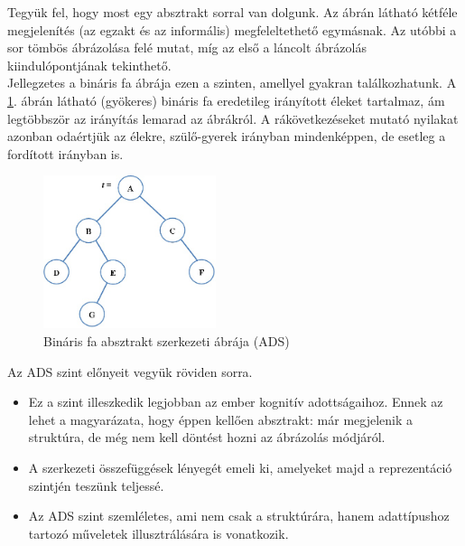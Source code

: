 \documentclass[12pt,margin=0px]{article}
\begin{document}
    {\footnotesize
    \noindent Tegyük fel, hogy most egy absztrakt sorral van dolgunk. Az ábrán látható kétféle megjelenítés (az egzakt és az informális) megfeleltethető egymásnak. Az utóbbi a sor tömbös ábrázolása felé mutat, míg az első a láncolt ábrázolás kiindulópontjának tekinthető.\\

    \noindent Jellegzetes a bináris fa ábrája ezen a szinten, amellyel gyakran találkozhatunk. A \ref{fig:bintree_ads}. ábrán látható (gyökeres) bináris fa eredetileg irányított éleket tartalmaz, ám legtöbbször az irányítás lemarad az ábrákról. A rákövetkezéseket mutató nyilakat azonban odaértjük az élekre, szülő-gyerek irányban mindenképpen, de esetleg a fordított irányban is.\\
    }

    \begin{figure}[H]
		\centering
		\includegraphics[width=0.45\textwidth]{img/bintree_ads.png}
		\caption{Bináris fa absztrakt szerkezeti ábrája (ADS)}
        \label{fig:bintree_ads}
	\end{figure}

    {\footnotesize
    \noindent Az ADS szint előnyeit vegyük röviden sorra.
    \begin{itemize}
        \item Ez a szint illeszkedik legjobban az ember kognitív adottságaihoz. Ennek az lehet a magyarázata, hogy éppen kellően absztrakt: már megjelenik a struktúra, de még nem kell döntést hozni az ábrázolás módjáról.
        \item A szerkezeti összefüggések lényegét emeli ki, amelyeket majd a reprezentáció szintjén teszünk teljessé.
        \item Az ADS szint szemléletes, ami nem csak a struktúrára, hanem adattípushoz tartozó műveletek illusztrálására is vonatkozik.
    \end{itemize}
    }

    \noindent {\footnotesize $\triangleleft$ \faLightbulbO }
	
\end{document}
